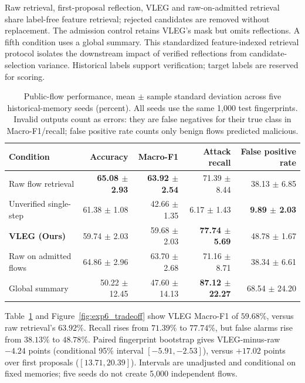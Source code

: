\documentclass[journal]{IEEEtran}
\theoremstyle{definition}
\theoremstyle{remark}
\begin{document}
Raw retrieval, first-proposal reflection, VLEG and raw-on-admitted retrieval share label-free feature retrieval; rejected candidates are removed without replacement. The admission control retains VLEG's mask but omits reflections. A fifth condition uses a global summary. This standardized feature-indexed retrieval protocol isolates the downstream impact of verified reflections from candidate-selection variance. Historical labels support verification; target labels are reserved for scoring.

\begin{table}[!t]
\centering
\caption{Public-flow performance, mean $\pm$ sample standard deviation across five historical-memory seeds (percent). All seeds use the same 1,000 test fingerprints. Invalid outputs count as errors: they are false negatives for their true class in Macro-F1/recall; false positive rate counts only benign flows predicted malicious.}
\label{tab:exp6_performance}
\small
\begin{tabular}{lrrrr}
\toprule
\textbf{Condition} & \textbf{Accuracy} & \textbf{Macro-F1} & \textbf{Attack recall} & \textbf{False positive rate} \\
\midrule
Raw flow retrieval & \textbf{65.08 $\pm$ 2.93} & \textbf{63.92 $\pm$ 2.54} & 71.39 $\pm$ 8.44 & 38.13 $\pm$ 6.85 \\
Unverified single-step & 61.38 $\pm$ 1.08 & 42.66 $\pm$ 1.35 & 6.17 $\pm$ 1.43 & \textbf{9.89 $\pm$ 2.03} \\
\textbf{VLEG (Ours)} & 59.74 $\pm$ 2.03 & 59.68 $\pm$ 2.03 & \textbf{77.74 $\pm$ 5.69} & 48.78 $\pm$ 1.67 \\
Raw on admitted flows & 64.86 $\pm$ 2.96 & 63.70 $\pm$ 2.68 & 71.16 $\pm$ 8.71 & 38.34 $\pm$ 6.61 \\
Global summary & 50.22 $\pm$ 12.45 & 47.60 $\pm$ 14.13 & \textbf{87.12 $\pm$ 22.27} & 68.54 $\pm$ 24.20 \\
\bottomrule
\end{tabular}
\end{table}

Table~\ref{tab:exp6_performance} and Figure~\ref{fig:exp6_tradeoff} show VLEG Macro-F1 of $59.68\%$, versus raw retrieval's $63.92\%$. Recall rises from $71.39\%$ to $77.74\%$, but false alarms rise from $38.13\%$ to $48.78\%$. Paired fingerprint bootstrap gives VLEG-minus-raw $-4.24$ points (conditional 95\% interval $[-5.91,-2.53]$), versus $+17.02$ points over first proposals ($[13.71,20.39]$). Intervals are unadjusted and conditional on fixed memories; five seeds do not create 5,000 independent flows.
\end{document}
